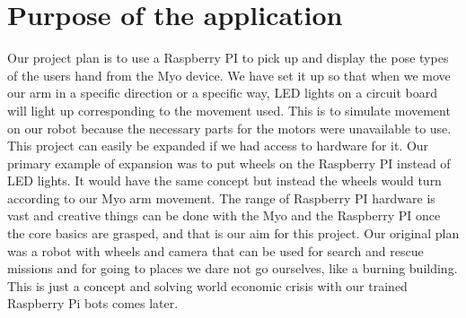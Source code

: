 \documentclass[12pt,a4paper,oneside,openany]{book}
\begin{document}
\chapter*{Purpose of the application}
Our project plan is to use a Raspberry PI to pick up and display the pose types of the users hand from the Myo device. We have set it up so that when we move our arm in a specific direction or a specific way, LED lights on a circuit board will light up corresponding to the movement used. This is to simulate movement on our robot because the necessary parts for the motors were unavailable to use. This project can easily be expanded if we had access to hardware for it. Our primary example of expansion was to put wheels on the Raspberry PI instead of LED lights. It would have the same concept but instead the wheels would turn according to our Myo arm movement. The range of Raspberry PI hardware is vast and creative things can be done with the Myo and the Raspberry PI once the core basics are grasped, and that is our aim for this project.
Our original plan was a robot with wheels and camera that can be used for search and rescue missions and for going to places we dare not go ourselves, like a burning building. This is just a concept and solving world economic crisis with our trained Raspberry Pi bots comes later.
\end{document}
